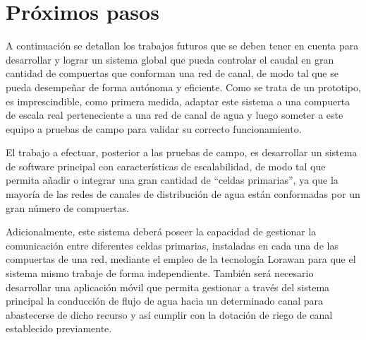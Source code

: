 \section{Próximos pasos}

A continuación se detallan los trabajos futuros que se deben tener en cuenta para desarrollar y lograr un sistema global que pueda controlar el caudal en gran cantidad de compuertas que conforman una red de canal, de modo tal que se pueda desempeñar de forma autónoma y eficiente. 
Como se trata de un prototipo, es imprescindible, como primera medida, adaptar este sistema a una compuerta de escala real perteneciente a una red de canal de agua y luego someter a este equipo a pruebas de campo para validar su correcto funcionamiento.

El trabajo a efectuar, posterior a las pruebas de campo, es desarrollar un sistema de software principal con características de escalabilidad, de modo tal que permita añadir o integrar una gran cantidad de “celdas primarias”, ya que la mayoría de las redes de canales de distribución de agua están conformadas por un gran número de compuertas.

Adicionalmente, este sistema deberá poseer la capacidad de gestionar la comunicación entre diferentes celdas primarias, instaladas en cada una de las compuertas de una red, mediante el empleo de la tecnología Lorawan para que el sistema mismo trabaje de forma independiente. También será necesario desarrollar una aplicación móvil que permita gestionar a través del sistema principal la conducción de flujo de agua hacia un determinado canal para abastecerse de dicho recurso y así cumplir con la dotación de riego de canal establecido previamente.


